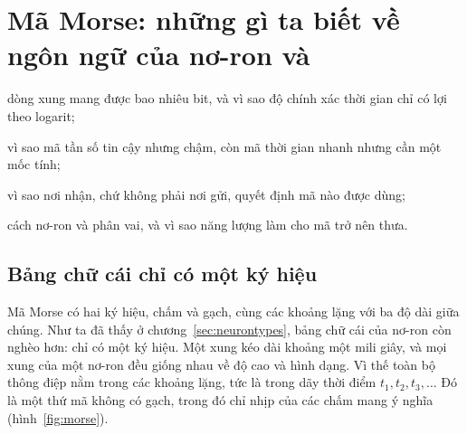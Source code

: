 \chapter{Mã Morse: những gì ta biết về ngôn ngữ của nơ-ron  và }
\label{sec:code}
\begin{chaptergoals}
\item dòng xung mang được bao nhiêu bit, và vì sao độ chính xác thời gian chỉ có lợi theo logarit;
\item vì sao mã tần số tin cậy nhưng chậm, còn mã thời gian nhanh nhưng cần một mốc tính;
\item vì sao nơi nhận, chứ không phải nơi gửi, quyết định mã nào được dùng;
\item cách nơ-ron  và  phân vai, và vì sao năng lượng làm cho mã trở nên thưa.
\end{chaptergoals}

\section{Bảng chữ cái chỉ có một ký hiệu}

Mã Morse có hai ký hiệu, chấm và gạch, cùng các khoảng lặng với ba độ dài giữa chúng. Như ta đã thấy ở chương~\ref{sec:neurontypes}, bảng chữ cái của nơ-ron còn nghèo hơn: chỉ có một ký hiệu. Một xung kéo dài khoảng một mili giây, và mọi xung của một nơ-ron đều giống nhau về độ cao và hình dạng. Vì thế toàn bộ thông điệp nằm trong các khoảng lặng, tức là trong dãy thời điểm $t_1,t_2,t_3,\dots$ Đó là một thứ mã không có gạch, trong đó chỉ nhịp của các chấm mang ý nghĩa (hình~\ref{fig:morse}).


